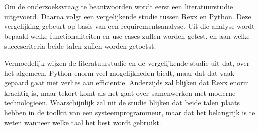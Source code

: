 \documentclass[dutch,dit,thesis]{hogentreport}
\begin{document}
\qquad Om de onderzoeksvraag te beantwoorden wordt eerst een literatuurstudie uitgevoerd. Daarna volgt een vergelijkende studie tussen Rexx en Python. Deze vergelijking gebeurt op basis van een requirementsanalyse. Uit die analyse wordt bepaald welke functionaliteiten en use cases zullen worden getest, en aan welke succescriteria beide talen zullen worden getoetst.

\qquad Vermoedelijk wijzen de literatuurstudie en de vergelijkende studie uit dat, over het algemeen, Python enorm veel mogelijkheden biedt, maar dat dat vaak gepaard gaat met verlies aan efficientie. Anderzijds zal blijken dat Rexx enorm krachtig is, maar tekort komt als het gaat over samenwerken met moderne technologieën. Waarschijnlijk zal uit de studie blijken dat beide talen plaats hebben in de toolkit van een systeemprogrammeur, maar dat het belangrijk is te weten wanneer welke taal het best wordt gebruikt.









%


\backmatter{}

\setlength\bibitemsep{2pt} %
\printbibliography[heading=bibintoc]
\end{document}
